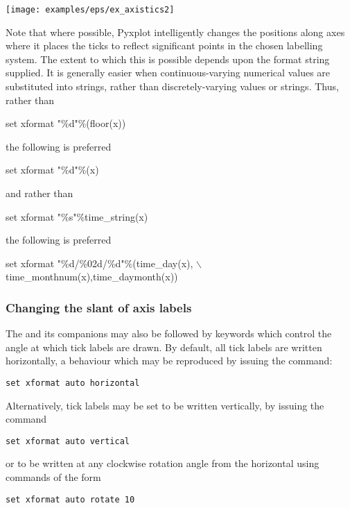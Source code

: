 \noindent\centerline{\texttt{[image: examples/eps/ex\_axistics2]}}

Note that where possible, Pyxplot intelligently changes the positions along
axes where it places the ticks to reflect significant points in the chosen
labelling system.  The extent to which this is possible depends upon the format
string supplied. It is generally easier when continuous-varying numerical
values are substituted into strings, rather than discretely-varying values or
strings. Thus, rather than

\begin{dontdo}
set xformat "\%d"\%(floor(x))
\end{dontdo}

\noindent the following is preferred

\begin{dodo}
set xformat "\%d"\%(x)
\end{dodo}

\noindent and rather than

\begin{dontdo}
set xformat "\%s"\%time\_string(x)
\end{dontdo}

\noindent the following is preferred

\begin{dodo}
set xformat "\%d/\%02d/\%d"\%(time\_day(x), $\backslash$\newline time\_monthnum(x),time\_daymonth(x))
\end{dodo}

\subsubsection{Changing the slant of axis labels}

The  and its companions may also be followed by keywords
which control the angle at which tick labels are drawn. By default, all tick
labels are written horizontally, a behaviour which may be reproduced by issuing
the command:
\begin{verbatim}
set xformat auto horizontal
\end{verbatim}
Alternatively, tick labels may be set to be written vertically, by issuing the command
\begin{verbatim}
set xformat auto vertical
\end{verbatim}
or to be written at any clockwise rotation angle from the horizontal using commands of the form
\begin{verbatim}
set xformat auto rotate 10
\end{verbatim}

